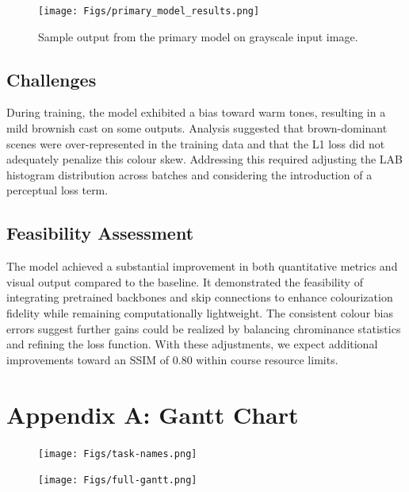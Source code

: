 \documentclass{article} %
\begin{document}
\begin{figure}[htbp]
    \centering
    \texttt{[image: Figs/primary\_model\_results.png]}
    \caption{Sample output from the primary model on grayscale input image.}
    \label{fig:primary_model_results}
\end{figure}
\FloatBarrier

\subsection{Challenges}

During training, the model exhibited a bias toward warm tones, resulting in a mild brownish cast on some outputs. Analysis suggested that brown-dominant scenes were over-represented in the training data and that the L1 loss did not adequately penalize this colour skew. Addressing this required adjusting the LAB histogram distribution across batches and considering the introduction of a perceptual loss term.

\subsection{Feasibility Assessment}

The model achieved a substantial improvement in both quantitative metrics and visual output compared to the baseline. It demonstrated the feasibility of integrating pretrained backbones and skip connections to enhance colourization fidelity while remaining computationally lightweight. The consistent colour bias errors suggest further gains could be realized by balancing chrominance statistics and refining the loss function. With these adjustments, we expect additional improvements toward an SSIM of 0.80 within course resource limits.

\label{last_page}

\newpage



\newpage
\section{Appendix A: Gantt Chart}

\begin{figure}[ht]
  \centering
  \texttt{[image: Figs/task-names.png]}
  \label{fig:task-names}
\end{figure}


\newpage
\begin{figure}[ht]
  \centering
  \texttt{[image: Figs/full-gantt.png]}
  \label{fig:gantt}
\end{figure}

\end{document}
